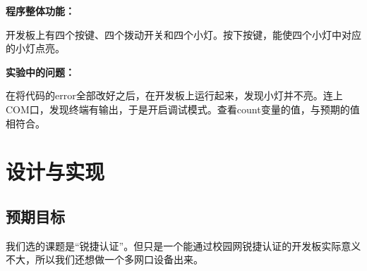 \documentclass{itecreport-zh}
\begin{document}
\textbf{程序整体功能：}


开发板上有四个按键、四个拨动开关和四个小灯。按下按键，能使四个小灯中对应的小灯点亮。


\textbf{实验中的问题：}


在将代码的error全部改好之后，在开发板上运行起来，发现小灯并不亮。连上COM口，发现终端有输出，于是开启调试模式。查看count变量的值，与预期的值相符合。

\chapter{设计与实现}
\section{预期目标}
我们选的课题是“锐捷认证”。但只是一个能通过校园网锐捷认证的开发板实际意义不大，所以我们还想做一个多网口设备出来。
\end{document}
